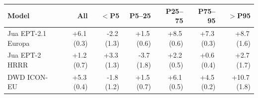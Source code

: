 \begin{tabular}{@{}lrrrrrr@{}}
\toprule
Model & All & $<$P5 & P5--25 & P25--75 & P75--95 & $>$P95 \\
\midrule
Jua EPT-2.1 Europa & +6.1\,(0.3) & -2.2\,(1.3) & +1.5\,(0.6) & +8.5\,(0.6) & +7.3\,(0.3) & +8.7\,(1.6) \\\addlinespace[0.35em]
Jua EPT-2 HRRR & +1.2\,(0.7) & +3.3\,(1.3) & -3.7\,(1.8) & +2.2\,(0.5) & +0.6\,(0.4) & +2.7\,(1.7) \\\addlinespace[0.35em]
DWD ICON-EU & +5.3\,(0.4) & -1.8\,(1.2) & +1.5\,(0.7) & +6.1\,(0.5) & +4.5\,(0.2) & +10.7\,(1.8) \\
\bottomrule
\end{tabular}
